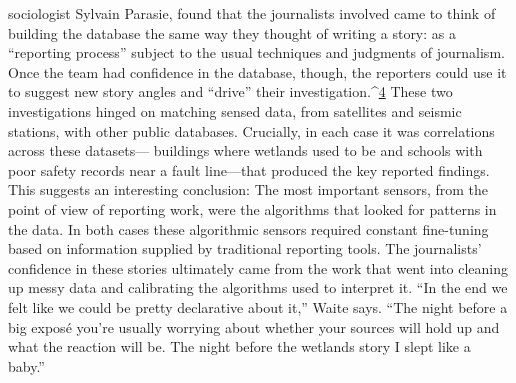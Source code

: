 \begin{itemize}
sociologist Sylvain Parasie, found that the journalists involved came to think
of building the database the same way they thought of writing a story: as a
``reporting process'' subject to the usual techniques and judgments of journalism.
Once the team had confidence in the database, though, the reporters
could use it to suggest new story angles and ``drive'' their investigation.^{\href{#endnotes-graves}{4}}
These two investigations hinged on matching sensed data, from satellites
and seismic stations, with other public databases. Crucially, in each case it
was correlations across these datasets— buildings where wetlands used to
be and schools with poor safety records near a fault line—that produced the
key reported findings. This suggests an interesting conclusion: The most
important sensors, from the point of view of reporting work, were the algorithms
that looked for patterns in the data. In both cases these algorithmic
sensors required constant fine-tuning based on information supplied by
traditional reporting tools. The journalists' confidence in these stories ultimately
came from the work that went into cleaning up messy data and calibrating
the algorithms used to interpret it. ``In the end we felt like we could
be pretty declarative about it,'' Waite says. ``The night before a big exposé
you're usually worrying about whether your sources will hold up and what
the reaction will be. The night before the wetlands story I slept like a baby.''


\end{itemize}
